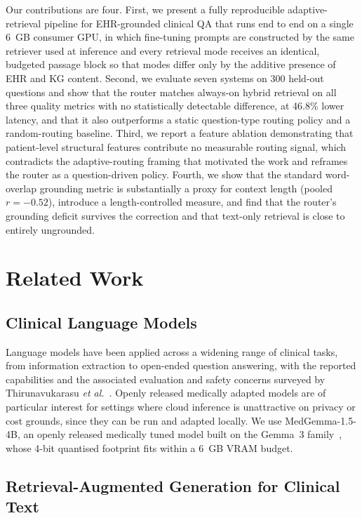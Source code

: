 \documentclass[conference]{IEEEtran}
\begin{document}
Our contributions are four. First, we present a fully reproducible
adaptive-retrieval pipeline for EHR-grounded clinical QA that runs
end to end on a single 6~GB consumer GPU, in which fine-tuning prompts
are constructed by the same retriever used at inference and every
retrieval mode receives an identical, budgeted passage block so that
modes differ only by the additive presence of EHR and KG content.
Second, we evaluate seven systems on 300 held-out questions and show
that the router matches always-on hybrid retrieval on all three
quality metrics with no statistically detectable difference, at 46.8\%
lower latency, and that it also outperforms a static question-type
routing policy and a random-routing baseline. Third, we report a
feature ablation demonstrating that patient-level structural features
contribute no measurable routing signal, which contradicts the
adaptive-routing framing that motivated the work and reframes the
router as a question-driven policy. Fourth, we show that the standard
word-overlap grounding metric is substantially a proxy for context
length (pooled $r = -0.52$), introduce a length-controlled measure,
and find that the router's grounding deficit survives the correction
and that text-only retrieval is close to entirely ungrounded.

\section{Related Work}

\subsection{Clinical Language Models}

Language models have been applied across a widening range of clinical
tasks, from information extraction to open-ended question answering,
with the reported capabilities and the associated evaluation and
safety concerns surveyed by Thirunavukarasu \textit{et
al.}~\cite{thirunavukarasu2023}. Openly released medically adapted
models are of particular interest for settings where cloud inference
is unattractive on privacy or cost grounds, since they can be run and
adapted locally. We use MedGemma-1.5-4B, an openly released medically
tuned model built on the Gemma~3 family~\cite{medgemma2025}, whose
4-bit quantised footprint fits within a 6~GB VRAM budget.

\subsection{Retrieval-Augmented Generation for Clinical Text}
\end{document}
